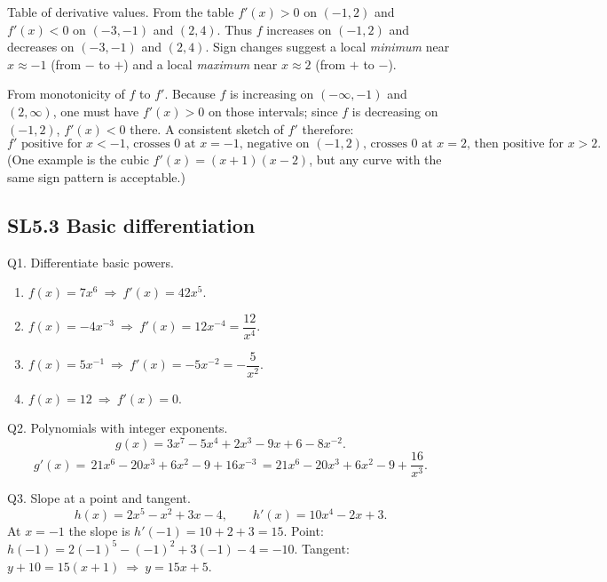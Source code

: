 \documentclass[11pt]{article}
\def\textbf#1{#1}%
\newcommand{\tocsubsection}[1]{\subsection{#1}}
\begin{document}
\begin{solution}
\textbf{Table of derivative values.}
From the table $f'(x)>0$ on $(-1,2)$ and $f'(x)<0$ on $(-3,-1)$ and $(2,4)$.  
Thus $f$ increases on $(-1,2)$ and decreases on $(-3,-1)$ and $(2,4)$.  
Sign changes suggest a local \emph{minimum} near $x\approx -1$ (from $-$ to $+$) and a local \emph{maximum} near $x\approx 2$ (from $+$ to $-$).
\end{solution}

\begin{solution}
\textbf{From monotonicity of $f$ to $f'$.}
Because $f$ is increasing on $(-\infty,-1)$ and $(2,\infty)$, one must have $f'(x)>0$ on those intervals; since $f$ is decreasing on $(-1,2)$, $f'(x)<0$ there.  
A consistent sketch of $f'$ therefore:
\[
\text{$f'$ positive for $x<-1$, crosses $0$ at $x=-1$, negative on $(-1,2)$, crosses $0$ at $x=2$, then positive for $x>2$.}
\]
(One example is the cubic $f'(x)=(x+1)(x-2)$, but any curve with the same sign pattern is acceptable.)
\end{solution}


\tocsubsection{SL5.3 Basic differentiation}


\begin{solution}
\textbf{Q1. Differentiate basic powers.}
\begin{enumerate}
  \item $f(x)=7x^{6}\ \Rightarrow\ f'(x)=\boxed{42x^{5}}$.
  \item $f(x)=-4x^{-3}\ \Rightarrow\ f'(x)=\boxed{12x^{-4}}=\dfrac{12}{x^{4}}$.
  \item $f(x)=5x^{-1}\ \Rightarrow\ f'(x)=\boxed{-5x^{-2}}=-\dfrac{5}{x^{2}}$.
  \item $f(x)=12\ \Rightarrow\ f'(x)=\boxed{0}$.
\end{enumerate}
\end{solution}

\begin{solution}
\textbf{Q2. Polynomials with integer exponents.}
\[
g(x)=3x^{7}-5x^{4}+2x^{3}-9x+6-8x^{-2}.
\]
\[
g'(x)=\boxed{\,21x^{6}-20x^{3}+6x^{2}-9+16x^{-3}\,}
=21x^{6}-20x^{3}+6x^{2}-9+\dfrac{16}{x^{3}}.
\]
\end{solution}

\begin{solution}
\textbf{Q3. Slope at a point and tangent.}
\[
h(x)=2x^{5}-x^{2}+3x-4,\qquad h'(x)=\boxed{10x^{4}-2x+3}.
\]
At $x=-1$ the slope is $h'(-1)=10+2+3= \boxed{15}$.  
Point: $h(-1)=2(-1)^{5}-(-1)^{2}+3(-1)-4=-10$.  
Tangent: $y+10=15(x+1)\ \Rightarrow\ \boxed{y=15x+5}$.
\end{solution}
\end{document}
